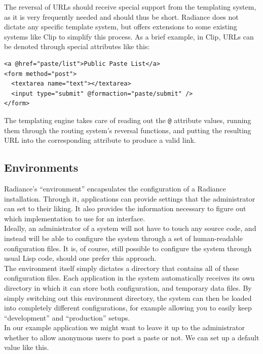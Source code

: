 \documentclass{sig-alternate}
\begin{document}
The reversal of URLs should receive special support from the templating system, as it is very frequently needed and should thus be short. Radiance does not dictate any specific template system, but offers extensions to some existing systems like Clip\cite{clip} to simplify this process. As a brief example, in Clip, URLs can be denoted through special attributes like this:

\begin{verbatim}
<a @href="paste/list">Public Paste List</a>
<form method="post">
  <textarea name="text"></textarea>
  <input type="submit" @formaction="paste/submit" />
</form>
\end{verbatim}

The templating engine takes care of reading out the \texttt{@} attribute values, running them through the routing system's reversal functions, and putting the resulting URL into the corresponding attribute to produce a valid link.

\subsection{Environments}
Radiance's ``environment'' encapsulates the configuration of a Radiance installation. Through it, applications can provide settings that the administrator can set to their liking. It also provides the information necessary to figure out which implementation to use for an interface. \\

Ideally, an administrator of a system will not have to touch any source code, and instead will be able to configure the system through a set of human-readable configuration files. It is, of course, still possible to configure the system through usual Lisp code, should one prefer this approach. \\

The environment itself simply dictates a directory that contains all of these configuration files. Each application in the system automatically receives its own directory in which it can store both configuration, and temporary data files. By simply switching out this environment directory, the system can then be loaded into completely different configurations, for example allowing you to easily keep ``development'' and ``production'' setups. \\

In our example application we might want to leave it up to the administrator whether to allow anonymous users to post a paste or not. We can set up a default value like this.
\end{document}
